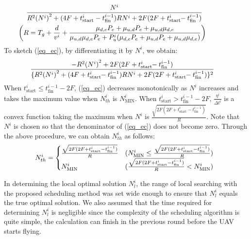 \documentclass{ieeeaccess}
\begin{document}
\begin{align}
&\hspace{-0.2cm}\frac{N^i}{R^2{(N^i)}^2+(4F+t_{\mathrm{start}}^i-t_{\mathrm{fin}}^{i-1})R{N^i}+2F(2F+t_{\mathrm{start}}^i\hspace{-1mm}-t_{\mathrm{fin}}^{i-1})}\hspace{1cm}\label{eq_ec}\\
&\hspace{-0.6cm}\biggl(R=T_g+\frac{d}{v^i}+\frac{\mu_{d,e}P_e+\mu_{u,d}P_e+\mu_{u,d}\mu_{d,e}}{\mu_{u,d}\mu_{d,e}P_e+P_u^i(\mu_{d,e}P_e+\mu_{u,d}P_e+\mu_{u,d}\mu_{d,e})}\biggr)\nonumber
\end{align}
%
To sketch (\ref{eq_ec}), by differentiating it by $N^i$, we obtain:
%
\begin{align}
\hspace{-4mm} \frac{-{R^2{(N^i)}^2}+2F(2F+t_{\mathrm{start}}^i\hspace{-1mm}-t_{\mathrm{fin}}^{i-1})}{\{R^2{(N^i)}^2+(4F+t_{\mathrm{start}}^i\hspace{-1mm}-t_{\mathrm{fin}}^{i-1})R{N^i}+2F(2F+t_{\mathrm{start}}^i\hspace{-1mm}-t_{\mathrm{fin}}^{i-1})\}^2}
\end{align}
%
When $t_{\mathrm{start}}^i \leq{t_{\mathrm{fin}}^{i-1}-2F}$, (\ref{eq_ec}) decreases monotonically as $N^i$ increases and takes the maximum value when $N_{th}^i$ is ${N_\mathrm {MIN}^i}$.
%
When $t_{\mathrm{start}}^i >{t_{\mathrm{fin}}^{i-1}-2F}$, $\frac{\eta^{i}}{{\Delta{t}}^i}$ is a convex function taking the maximum when $N^i$ is $\frac{\sqrt{2F(2F+t_{\mathrm{start}}^i-t_{\mathrm{fin}}^{i-1})}}{R}$.
%
Note that $N^i$ is chosen so that the denominator of (\ref{eq_ec}) does not become zero.
%
Through the above procedure, we can obtain $N_{th}^i$ as follows:
%
\begin{align}
 \hspace{-1.5mm} N_{th}^i= \begin{cases}
    \frac{\sqrt{2F(2F+t_{\mathrm{start}}^i-t_{\mathrm{fin}}^{i-1})}}{R} & ({N_\mathrm {MIN}^i}\leq{\frac{\sqrt{2F(2F+t_{\mathrm{start}}^i-t_{\mathrm{fin}}^{i-1})}}{R}}) \\
    {N_\mathrm {MIN}^i}& (\frac{\sqrt{2F(2F+t_{\mathrm{start}}^i-t_{\mathrm{fin}}^{i-1})}}{R}<{N_\mathrm {MIN}^i})
  \end{cases}
\end{align}

In determining the local optimal solution $N_{l}^i$, the range of local searching with the proposed scheduling method was set wide enough to ensure that $N_{l}^i$ equals the true optimal solution. 
We also assumed that the time required for determining $N_{l}^i$ is negligible since the complexity of the scheduling algorithm is quite simple, the calculation can finish in the previous round before the UAV starts flying.
\end{document}
